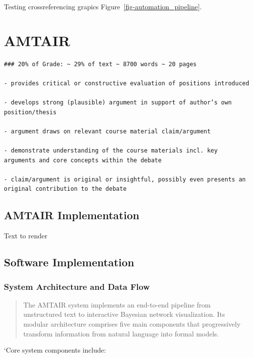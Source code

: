 \documentclass[
  11pt,
  letterpaper,
]{book}
\begin{document}
Testing crossreferencing grapics Figure~\ref{fig-automation_pipeline}.


\chapter{AMTAIR}\label{amtair}

\begin{verbatim}
### 20% of Grade: ~ 29% of text ~ 8700 words ~ 20 pages

- provides critical or constructive evaluation of positions introduced

- develops strong (plausible) argument in support of author’s own position/thesis

- argument draws on relevant course material claim/argument

- demonstrate understanding of the course materials incl. key arguments and core concepts within the debate

- claim/argument is original or insightful, possibly even presents an original contribution to the debate 
\end{verbatim}

\section{AMTAIR Implementation}\label{sec-amtair-implementation}

Text to render

\section{Software Implementation}\label{sec-software-implementation}

\subsection{System Architecture and Data
Flow}\label{sec-system-architecture}

\begin{quote}
The AMTAIR system implements an end-to-end pipeline from unstructured
text to interactive Bayesian network visualization. Its modular
architecture comprises five main components that progressively transform
information from natural language into formal models.
\end{quote}

`Core system components include:
\end{document}
